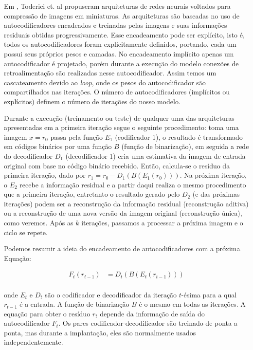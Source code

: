 Em \cite{Variable2016Toderici}, Toderici et. al propuseram arquiteturas de redes neurais voltados para compressão de imagens em miniaturas. As arquiteturas são baseadas no uso de autocodificadores encadeados e treinadas pelas imagens e suas informações residuais obtidas progressivamente. 
Esse encadeamento pode ser explícito, isto é, todos os autocodificadores foram explicitamente definidos, portando, cada um possui seus próprios pesos e camadas. 
No encadeamento implícito apenas um autocodificador é projetado, porém durante a execução do modelo conexões de retroalimentação são realizadas nesse autocodificador. Assim temos um cascateamento devido ao \textit{loop}, onde os pesos do autocodificador são compartilhados nas iterações. O número de autocodificadores (implícitos ou explícitos) definem o número de iterações do nosso modelo. 

Durante a execução (treinamento ou teste) de qualquer uma das arquiteturas apresentadas em \cite{Variable2016Toderici} a primeira iteração segue o seguinte procedimento: toma uma imagem $x = r_0$ passa pela função $E_1$ (codificador 1), o resultado é transformado em códigos binários por uma função $B$ (função de binarização), em seguida a rede do decodificador $D_1$ (decodificador 1) cria uma estimativa da imagem de entrada original com base no código binário recebido. Então, calcula-se o resíduo da primeira iteração, dado por $r_1 = r_0 - D_1(B(E_1(r_0)))$. 
Na próxima iteração, o $E_2$ recebe a informação residual e a partir daqui realiza o mesmo procedimento que a primeira iteração, entretanto o resultado gerado pelo $D_2$ (e das próximas iterações) podem ser a reconstrução da informação residual (reconstrução aditiva) ou a reconstrução de uma nova versão da imagem original (reconstrução única), como veremos.  Após as $k$ iterações, passamos a processar a próxima imagem e o ciclo se repete. 

Podemos resumir a ideia do encadeamento de autocodificadores com a próxima Equação: 

\begin{equation}
\begin{aligned}
F_t(r_{t-1}) &= D_t(B(E_t(r_{t-1}))) \\
\end{aligned}
\end{equation}

onde $E_t$ e $D_t$ são o codificador e decodificador da iteração $t$-ésima para a qual $ r_{t-1}$ é a entrada. A função de binarização $B$ é o mesmo em todas as iterações. A equação para obter o resíduo $r_t$ depende da informação de saída do autocodificador $F_t$.  Os pares codificador-decodificador são treinado de ponta a ponta, mas durante a implantação, eles são normalmente usados independentemente.

